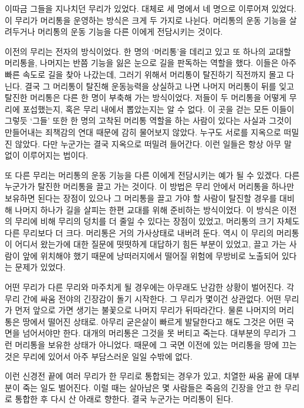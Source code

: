 \begin{article}
이따금 그들을 지나치던 무리가 있었다. 대체로 세 명에서 네 명으로 이루어져 있었다. 이 무리가 머리통을 운영하는 방식은 크게 두 가지로 나뉜다. 머리통의 운동 기능을 살려두거나 머리통의 운동 기능을 다른 이에게 전담시키는 것이다.

이전의 무리는 전자의 방식이었다. 한 명의 `머리통'을 데리고 있고 또 하나의 교대할 머리통을, 나머지는 반쯤 기능을 잃은 눈으로 길을 판독하는 역할을 했다. 이들은 아주 빠른 속도로 길을 찾아 나갔는데, 그러기 위해서 머리통이 탈진하기 직전까지 몰고 다닌다. 결국 그 머리통이 탈진해 운동능력을 상실하고 나면 나머지 머리통이 뒤를 잊고 탈진한 머리통은 다른 한 명이 부축해 가는 방식이었다. 저들이 두 머리통을 어떻게 무리에 포섭했는지, 혹은 무리 내에서 뽑았는지는 알 수 없다. 이 곳을 걷는 모든 이들이 그렇듯 `그들' 또한 한 명의 고착된 머리통 역할을 하는 사람이 있다는 사실과 그것이 만들어내는 죄책감의 연대 때문에 감히 물어보지 않았다. 누구도 서로를 지옥으로 떠밀진 않았다. 다만 누군가는 결국 지옥으로 떠밀려 들어간다. 이런 일들은 항상 아무 말 없이 이루어지는 법이다.

또 다른 무리는 머리통의 운동 기능을 다른 이에게 전담시키는 예가 될 수 있겠다. 다른 누군가가 탈진한 머리통을 끌고 가는 것이다. 이 방법은 무리 안에서 머리통을 하나만 보유하면 된다는 장점이 있으나 그 머리통을 끌고 가야 할 사람이 탈진할 경우를 대비해 나머지 하나가 길을 살피는 한편 교대를 위해 준비하는 방식이었다. 이 방식은 이전의 무리에 비해 무리의 덩치를 더 줄일 수 있다는 장점이 있었고, 머리통의 크기 자체도 다른 무리보다 더 크다. 머리통은 거의 가사상태로 내버려 둔다. 역시 이 무리의 머리통이 어디서 왔는가에 대한 질문에 떳떳하게 대답하기 힘든 부분이 있었고, 끌고 가는 사람이 앞에 위치해야 했기 때문에 낭떠러지에서 떨어질 위험에 무방비로 노출되어 있다는 문제가 있었다.

어떤 무리가 다른 무리와 마주치게 될 경우에는 아무래도 난감한 상황이 벌어진다. 각 무리 간에 싸움 전야의 긴장감이 돌기 시작한다. 그 무리가 몇이건 상관없다. 어떤 무리가 먼저 앞으로 가면 생기는 불꽃으로 나머지 무리가 뒤따라간다. 물론 나머지의 머리통은 땅에서 떨어진 상태로. 아무리 굳은살이 빠르게 발달한다고 해도 그것은 어떤 국면을 넘어서야만 한다. 대개의 머리통은 그것을 못 버티고 죽는다. 대부분의 무리가 그런 머리통을 보유한 상태가 아니었다. 때문에 그 국면 이전에 있는 머리통을 땅에 끄는 것은 무리에 있어서 아주 부담스러운 일일 수밖에 없다.

이런 신경전 끝에 여러 무리가 한 무리로 통합되는 경우가 있고, 치열한 싸움 끝에 대부분이 죽는 일도 벌어진다. 이럴 때는 살아남은 몇 사람들은 죽음의 긴장을 안고 한 무리로 통합한 후 다시 산 아래로 향한다. 결국 누군가는 머리통이 된다.


\end{article}
